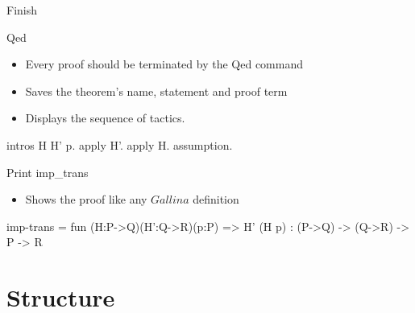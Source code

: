\begin{frame}[fragile]{Finish}
	\begin{user}
	Qed
	\end{user}
	\pause
	\begin{itemize}
		\item Every proof should be terminated by the Qed command
		\pause
		\item Saves the theorem's name, statement and proof term
		\pause
		\item Displays the sequence of tactics.
	\end{itemize}
	\begin{coq}
		intros H H' p.
		apply H'.
		apply H.
		assumption.
	\end{coq}
	\pause
	\medskip
	\begin{user}
		Print imp_trans
	\end{user}
	\pause
	\begin{itemize}
		\item Shows the proof like any $Gallina$ definition
	\end{itemize}
	\begin{coq}
		imp-trans = fun (H:P->Q)(H':Q->R)(p:P) => H' (H p)
		 : (P->Q) -> (Q->R) -> P -> R
	\end{coq}
\end{frame}

\section{Structure}

